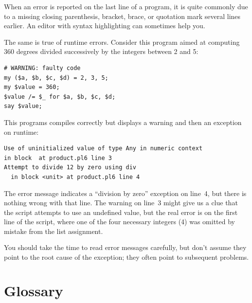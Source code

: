 When an error is reported on the last line of a program, 
it is quite commonly due to a missing closing parenthesis, 
bracket, brace, or quotation mark several lines earlier. 
An editor with syntax highlighting can sometimes help you.


The same is true of runtime errors. Consider this program 
aimed at computing 360 degrees divided successively by 
the integers between 2 and 5:

\begin{verbatim}
# WARNING: faulty code
my ($a, $b, $c, $d) = 2, 3, 5;
my $value = 360;
$value /= $_ for $a, $b, $c, $d;
say $value;
\end{verbatim}

This programs compiles correctly but displays a warning and 
then an exception on runtime:

\begin{verbatim}
Use of uninitialized value of type Any in numeric context 
in block  at product.pl6 line 3
Attempt to divide 12 by zero using div
  in block <unit> at product.pl6 line 4
\end{verbatim}
%

The error message indicates a ``division by zero'' exception 
on line~4, but there is nothing wrong with that line. 
The warning on line~3 might give us a clue that the 
script attempts to use an undefined value, but the real error 
is on the first line of the script, where one of the four 
necessary integers (4) was omitted by mistake from the list 
assignment.


You should take the time to read error messages carefully, 
but don't assume they point to the root cause of the 
exception; they often point to subsequent problems.


\section{Glossary}

